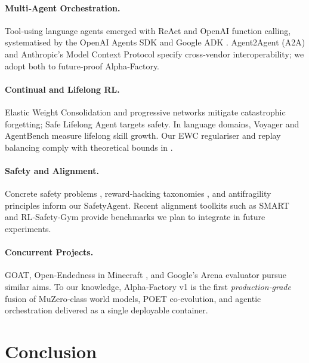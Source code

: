 \paragraph{Multi‑Agent Orchestration.}
Tool‑using language agents emerged with ReAct and OpenAI function calling,
systematised by the OpenAI Agents SDK \cite{openaiagents2024} and Google ADK
\cite{googleadk2024}.  Agent2Agent (A2A) \cite{a2a2023} and Anthropic’s Model
Context Protocol \cite{anthropicmcp2023} specify cross‑vendor
interoperability; we adopt both to future‑proof Alpha‑Factory.

\paragraph{Continual and Lifelong RL.}
Elastic Weight Consolidation \cite{kirkpatrick2017ewc} and
progressive networks mitigate catastrophic forgetting; Safe Lifelong Agent
\cite{vanseijen2019sla} targets safety.  In language domains, Voyager
\cite{wang2023voyager} and AgentBench \cite{huang2023agentbench} measure
lifelong skill growth.  Our EWC regulariser and replay balancing comply with
theoretical bounds in \cite{jiang2015dependence}.

\paragraph{Safety and Alignment.}
Concrete safety problems \cite{amodei2016concrete},
reward‑hacking taxonomies \cite{hadfield2021neurips},
and antifragility principles \cite{taleb2012antifragile,richter2021antifragile}
inform our SafetyAgent.  Recent alignment toolkits such as SMART
\cite{hofmann2022smart} and RL‑Safety‑Gym \cite{zahavy2021safetygym} provide
benchmarks we plan to integrate in future experiments.

\paragraph{Concurrent Projects.}
GOAT, Open‑Endedness in Minecraft \cite{bakhtin2022openended},
and Google’s Arena evaluator \cite{kilcher2023arena} pursue similar aims.
To our knowledge, Alpha‑Factory v1 is the first \emph{production‑grade}
fusion of MuZero‑class world models, POET co‑evolution, and agentic
orchestration delivered as a single deployable container.

\section{Conclusion}

